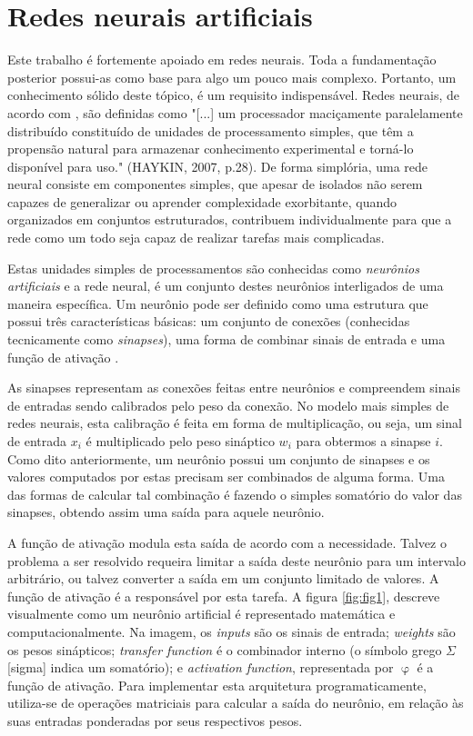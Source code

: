 \section{Redes neurais artificiais}
\label{sec:rna}

Este trabalho é fortemente apoiado em redes neurais. Toda a fundamentação posterior possui-as como base para algo um pouco mais complexo. Portanto, um conhecimento sólido deste tópico, é um requisito indispensável. Redes neurais, de acordo com \cite{haykin_redes_2007}, são definidas como "[...] um processador maciçamente paralelamente distribuído constituído de unidades de processamento simples, que têm a propensão natural para armazenar conhecimento experimental e torná-lo disponível para uso." (HAYKIN, 2007, p.28). De forma simplória, uma rede neural consiste em componentes simples, que apesar de isolados não serem capazes de generalizar ou aprender complexidade exorbitante, quando organizados em conjuntos estruturados, contribuem individualmente para que a rede como um todo seja capaz de realizar tarefas mais complicadas.

Estas unidades simples de processamentos são conhecidas como \textit{neurônios artificiais} e a rede neural, é um conjunto destes neurônios interligados de uma maneira específica. Um neurônio pode ser definido como uma estrutura que possui três características básicas: um conjunto de conexões (conhecidas tecnicamente como \textit{sinapses}), uma forma de combinar sinais de entrada e uma função de ativação \cite{haykin_redes_2007}. 

As sinapses representam as conexões feitas entre neurônios e compreendem sinais de entradas sendo calibrados pelo peso da conexão. No modelo mais simples de redes neurais, esta calibração é feita em forma de multiplicação, ou seja, um sinal de entrada $x_i$ é multiplicado pelo peso sináptico $w_i$ para obtermos a sinapse $i$. Como dito anteriormente, um neurônio possui um conjunto de sinapses e os valores computados por estas precisam ser combinados de alguma forma. Uma das formas de calcular tal combinação é fazendo o simples somatório do valor das sinapses, obtendo assim uma saída para aquele neurônio. 

A função de ativação modula esta saída de acordo com a necessidade. Talvez o problema a ser resolvido requeira limitar a saída deste neurônio para um intervalo arbitrário, ou talvez converter a saída em um conjunto limitado de valores. A função de ativação é a responsável por esta tarefa. A figura \ref{fig:fig1}, descreve visualmente como um neurônio artificial é representado matemática e computacionalmente. Na imagem, os \textit{inputs} são os sinais de entrada; \textit{weights} são os pesos sinápticos; \textit{transfer function} é o combinador interno (o símbolo grego $\Sigma$ [sigma] indica um somatório); e \textit{activation function}, representada por $\upvarphi$ é a função de ativação. Para implementar esta arquitetura programaticamente, utiliza-se de operações matriciais para calcular a saída do neurônio, em relação às suas entradas ponderadas por seus respectivos pesos.

